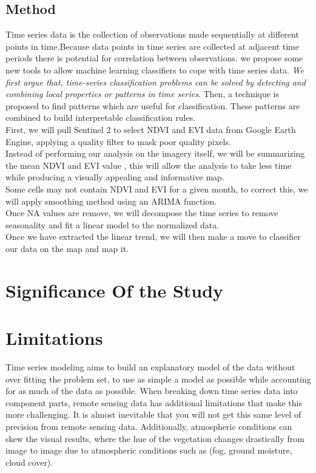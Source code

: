 \documentclass[12pt,a4paper]{article}
\begin{document}
	 \subsection{Method}
	Time series data is the collection of observations made sequentially at different points in time.Because data points in time series are collected at adjacent time periods there is potential for correlation between observations.	we propose some new tools to allow machine learning classifiers to cope with time series data.\emph{ We first argue that, time-series classification problems can be solved by detecting and combining local properties or patterns in time series}. Then, a technique is proposed to find patterns which are useful for classification. These patterns are combined to build interpretable classification rules.\\
	First, we will pull Sentinel 2 to select NDVI and EVI data from Google Earth Engine, applying a quality filter to mask poor quality pixels.\\	
	Instead of performing our analysis on the imagery itself, we will be summarizing the mean NDVI and EVI value , this will allow the analysis to take less time while producing a visually appealing and informative map.\\	
	Some cells may not contain NDVI and EVI for a given month, to correct this, we will apply  smoothing method using an ARIMA function.\\	
	Once NA values are remove, we will decompose the time series to remove seasonality and fit a linear model to the normalized data.\\	
	Once we have extracted the linear trend, we will then make a move to classifier our data on the map and map it.\
	\section{Significance Of the Study}
	
	\section{Limitations}
	Time series modeling aims to build an explanatory model of the data without over fitting the problem set, to use as simple a model as possible while accounting for as much of the data as possible. When breaking down time series data into component parts, remote sensing data has additional limitations that make this more challenging. It is almost inevitable that you will not get this same level of precision from remote sensing data. Additionally, atmospheric conditions can skew the visual results, where the hue of the vegetation changes drastically from image to image due to atmospheric conditions such as (fog, ground moisture, cloud cover).
	
	\printbibliography
\end{document}
